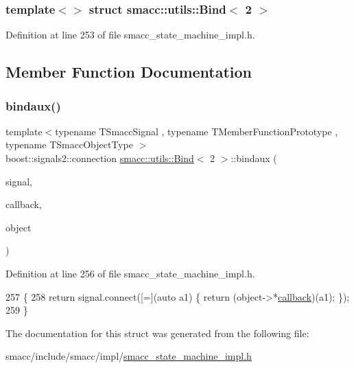 \subsubsection*{template$<$$>$\newline
struct smacc\+::utils\+::\+Bind$<$ 2 $>$}



Definition at line 253 of file smacc\+\_\+state\+\_\+machine\+\_\+impl.\+h.



\subsection{Member Function Documentation}
\mbox{\label{structsmacc_1_1utils_1_1Bind_3_012_01_4_aa9bba43cc8862f00155b17d2625bd99e}} 
\subsubsection{\texorpdfstring{bindaux()}{bindaux()}}
{\footnotesize\ttfamily template$<$typename T\+Smacc\+Signal , typename T\+Member\+Function\+Prototype , typename T\+Smacc\+Object\+Type $>$ \\
boost\+::signals2\+::connection \hyperlink{structsmacc_1_1utils_1_1Bind}{smacc\+::utils\+::\+Bind}$<$ 2 $>$\+::bindaux (\begin{DoxyParamCaption}\item[{T\+Smacc\+Signal \&}]{signal,  }\item[{T\+Member\+Function\+Prototype}]{callback,  }\item[{T\+Smacc\+Object\+Type $\ast$}]{object }\end{DoxyParamCaption})\hspace{0.3cm}{\ttfamily [inline]}}



Definition at line 256 of file smacc\+\_\+state\+\_\+machine\+\_\+impl.\+h.


\begin{DoxyCode}
257     \{
258         \textcolor{keywordflow}{return} signal.connect([=](\textcolor{keyword}{auto} a1) \{ \textcolor{keywordflow}{return} (object->*\hyperlink{servers_2opencv__perception__node_2opencv__perception__node_8cpp_a050e697bd654facce10ea3f6549669b3}{callback})(a1); \});
259     \}
\end{DoxyCode}


The documentation for this struct was generated from the following file\+:\begin{DoxyCompactItemize}
\item 
smacc/include/smacc/impl/\hyperlink{smacc__state__machine__impl_8h}{smacc\+\_\+state\+\_\+machine\+\_\+impl.\+h}\end{DoxyCompactItemize}
